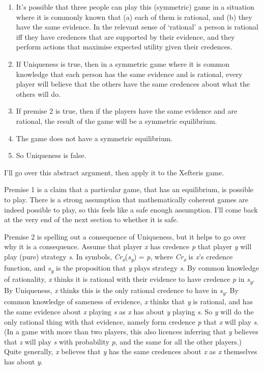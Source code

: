 \documentclass[
  12pt,
  letterpaper,
  DIV=11,
  numbers=noendperiod]{scrreprt}
\providecommand{\tightlist}{%
  \setlength{\itemsep}{0pt}\setlength{\parskip}{0pt}}\usepackage{longtable,booktabs,array}
\begin{document}
\begin{enumerate}
\def\labelenumi{\arabic{enumi}.}
\tightlist
\item
  It's possible that three people can play this (symmetric) game in a
  situation where it is commonly known that (a) each of them is
  rational, and (b) they have the same evidence. In the relevant sense
  of `rational' a person is rational iff they have credences that are
  supported by their evidence, and they perform actions that maximise
  expected utility given their credences.
\item
  If Uniqueness is true, then in a symmetric game where it is common
  knowledge that each person has the same evidence and is rational,
  every player will believe that the others have the same credences
  about what the others will do.
\item
  If premise 2 is true, then if the players have the same evidence and
  are rational, the result of the game will be a symmetric equilibrium.
\item
  The game does not have a symmetric equilibrium.
\item
  So Uniqueness is false.
\end{enumerate}

I'll go over this abstract argument, then apply it to the Xefteris game.

Premise 1 is a claim that a particular game, that has an equilibrium, is
possible to play. There is a strong assumption that mathematically
coherent games are indeed possible to play, so this feels like a safe
enough assumption. I'll come back at the very end of the next section to
whether it is safe.

Premise 2 is spelling out a consequence of Uniqueness, but it helps to
go over why it is a consequence. Assume that player \emph{x} has
credence \emph{p} that player \emph{y} will play (pure) strategy
\emph{s}. In symbols,
\emph{Cr\textsubscript{x}}(\emph{s\textsubscript{y}}) = \emph{p}, where
\emph{Cr\textsubscript{x}} is \emph{x}'s credence function, and
\emph{s\textsubscript{y}} is the proposition that \emph{y} plays
strategy \emph{s}. By common knowledge of rationality, \emph{x} thinks
it is rational with their evidence to have credence \emph{p} in
\emph{s\textsubscript{y}}. By Uniqueness, \emph{x} thinks this is the
only rational credence to have in \emph{s\textsubscript{y}}. By common
knowledge of sameness of evidence, \emph{x} thinks that \emph{y} is
rational, and has the same evidence about \emph{x} playing \emph{s} as
\emph{x} has about \emph{y} playing \emph{s}. So \emph{y} will do the
only rational thing with that evidence, namely form credence \emph{p}
that \emph{x} will play \emph{s}. (In a game with more than two players,
this also licences inferring that \emph{y} believes that \emph{z} will
play \emph{s} with probability \emph{p}, and the same for all the other
players.) Quite generally, \emph{x} believes that \emph{y} has the same
credences about \emph{x} as \emph{x} themselves has about \emph{y}.
\end{document}
